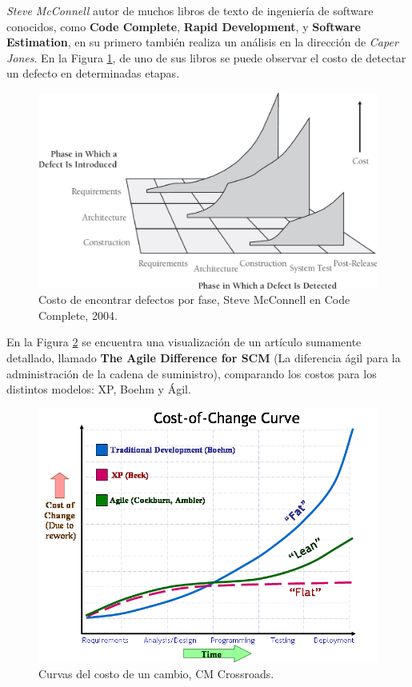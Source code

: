\textit{Steve McConnell} autor de muchos libros de texto de ingeniería de software conocidos, como \textbf{Code Complete}\cite{mcconnell2004code}, \textbf{Rapid Development}\cite{mcconnell1996rapid}, y \textbf{Software Estimation}\cite{mcconnell2006software}, en su primero también realiza un análisis en la dirección de \textit{Caper Jones}. En la Figura \ref{fig:defect cost increase}, de uno de sus libros se puede observar el costo de detectar un defecto en determinadas etapas.\\

\begin{figure}[ht]
    \centering
    \includegraphics[scale=0.3]{images/DefectCostIncrease2004.jpg}
    \caption{Costo de encontrar defectos por fase, Steve McConnell en Code Complete, 2004.}
    \label{fig:defect cost increase}
\end{figure}

En la Figura \ref{fig:cost-of-change curve} se encuentra una visualización de un artículo sumamente detallado, llamado \textbf{The Agile Difference for SCM}\cite{TheAgileDifference} (La diferencia ágil para la administración de la cadena de suministro), comparando los costos para los distintos modelos: XP, Boehm y Ágil.\\

\begin{figure}[ht]
    \centering
    \includegraphics[scale=0.5]{images/TheAgileDifference.png}
    \caption{Curvas del costo de un cambio, CM Crossroads.}
    \label{fig:cost-of-change curve}
\end{figure}

